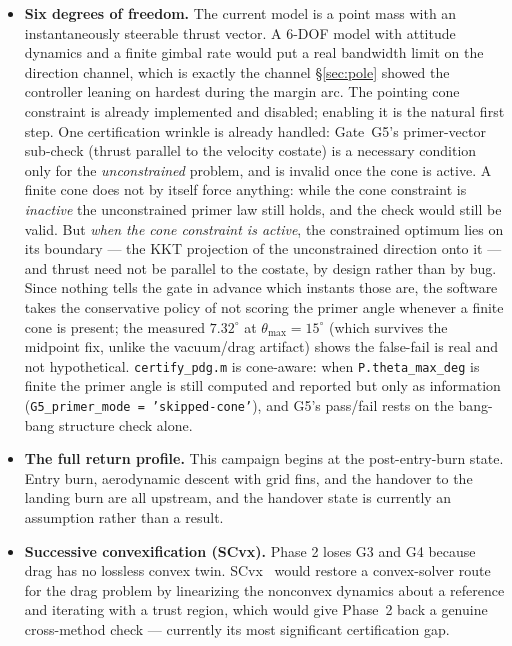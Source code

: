 \documentclass[11pt]{article}
\begin{document}
\begin{itemize}

\item \textbf{Six degrees of freedom.} The current model is a point mass
with an instantaneously steerable thrust vector. A 6-DOF model with
attitude dynamics and a finite gimbal rate would put a real bandwidth limit
on the direction channel, which is exactly the channel
\S\ref{sec:pole} showed the controller leaning on hardest during the margin
arc. The pointing cone constraint is already implemented and disabled;
enabling it is the natural first step. One certification wrinkle is already
handled: Gate~G5's primer-vector sub-check (thrust parallel to the velocity
costate) is a necessary condition only for the \emph{unconstrained} problem,
and is invalid once the cone is active. A finite cone does not by itself
force anything: while the cone constraint is \emph{inactive} the
unconstrained primer law still holds, and the check would still be valid.
But \emph{when the cone constraint is active}, the constrained optimum lies
on its boundary --- the KKT projection of the unconstrained direction onto
it --- and thrust need not be parallel to the costate, by design rather than
by bug. Since nothing tells the gate in advance which instants those are,
the software takes the conservative policy of not scoring the primer angle
whenever a finite cone is present; the measured $7.32^\circ$ at
$\theta_{\max} = 15^\circ$ (which survives the midpoint fix, unlike the
vacuum/drag artifact) shows the false-fail is real and not
hypothetical. \texttt{certify\_pdg.m} is cone-aware: when
\texttt{P.theta\_max\_deg} is finite the primer angle is still computed and
reported but only as information (\texttt{G5\_primer\_mode =
'skipped-cone'}), and G5's pass/fail rests on the bang-bang structure check
alone.

\item \textbf{The full return profile.} This campaign begins at the
post-entry-burn state. Entry burn, aerodynamic descent with grid fins, and
the handover to the landing burn are all upstream, and the handover state is
currently an assumption rather than a result.

\item \textbf{Successive convexification (SCvx).} Phase 2 loses G3 and G4
because drag has no lossless convex twin. SCvx~\cite{mao2016} would restore
a convex-solver route for the drag problem by linearizing the nonconvex
dynamics about a reference and iterating with a trust region, which would
give Phase~2 back a genuine cross-method check --- currently its most
significant certification gap.


\end{itemize}
\end{document}
